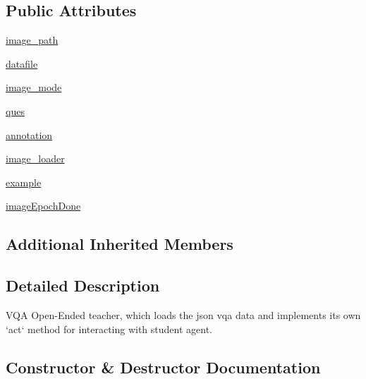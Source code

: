 \subsection*{Public Attributes}
\begin{DoxyCompactItemize}
\item 
\hyperlink{classparlai_1_1tasks_1_1vqa__v1_1_1agents_1_1OeTeacher_a93136db89c9b7943ff6aaeb28157d12e}{image\+\_\+path}
\item 
\hyperlink{classparlai_1_1tasks_1_1vqa__v1_1_1agents_1_1OeTeacher_a12671717135e971a2ec374079432b670}{datafile}
\item 
\hyperlink{classparlai_1_1tasks_1_1vqa__v1_1_1agents_1_1OeTeacher_ae600010b7db2aaf523db54fb0ef28906}{image\+\_\+mode}
\item 
\hyperlink{classparlai_1_1tasks_1_1vqa__v1_1_1agents_1_1OeTeacher_a180c1596f72999be0858a5c9c651c93a}{ques}
\item 
\hyperlink{classparlai_1_1tasks_1_1vqa__v1_1_1agents_1_1OeTeacher_ae7832c20e91858e3bbea62e333d585e5}{annotation}
\item 
\hyperlink{classparlai_1_1tasks_1_1vqa__v1_1_1agents_1_1OeTeacher_a658acd2bdd2d7c4fdd93fd0518423441}{image\+\_\+loader}
\item 
\hyperlink{classparlai_1_1tasks_1_1vqa__v1_1_1agents_1_1OeTeacher_ae9a071fc33afe67bfeae01dbd2857608}{example}
\item 
\hyperlink{classparlai_1_1tasks_1_1vqa__v1_1_1agents_1_1OeTeacher_a5db996acbd73e3fc6f45d69dd61fcefd}{image\+Epoch\+Done}
\end{DoxyCompactItemize}
\subsection*{Additional Inherited Members}


\subsection{Detailed Description}
\begin{DoxyVerb}VQA Open-Ended teacher, which loads the json vqa data and implements its own `act`
method for interacting with student agent.
\end{DoxyVerb}
 

\subsection{Constructor \& Destructor Documentation}
\mbox{\label{classparlai_1_1tasks_1_1vqa__v1_1_1agents_1_1OeTeacher_a508a90334629ef603b9520a98b5200a0}} 
